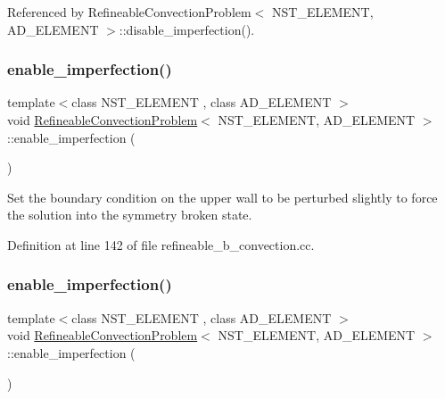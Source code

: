 Referenced by Refineable\+Convection\+Problem$<$ N\+S\+T\+\_\+\+E\+L\+E\+M\+E\+N\+T, A\+D\+\_\+\+E\+L\+E\+M\+E\+N\+T $>$\+::disable\+\_\+imperfection().

\mbox{\label{classRefineableConvectionProblem_aa97926281f88014ad45f43972184a77c}} 
\subsubsection{\texorpdfstring{enable\+\_\+imperfection()}{enable\_imperfection()}\hspace{0.1cm}{\footnotesize\ttfamily [1/2]}}
{\footnotesize\ttfamily template$<$class N\+S\+T\+\_\+\+E\+L\+E\+M\+E\+NT , class A\+D\+\_\+\+E\+L\+E\+M\+E\+NT $>$ \\
void \hyperlink{classRefineableConvectionProblem}{Refineable\+Convection\+Problem}$<$ N\+S\+T\+\_\+\+E\+L\+E\+M\+E\+NT, A\+D\+\_\+\+E\+L\+E\+M\+E\+NT $>$\+::enable\+\_\+imperfection (\begin{DoxyParamCaption}{ }\end{DoxyParamCaption})\hspace{0.3cm}{\ttfamily [inline]}}



Set the boundary condition on the upper wall to be perturbed slightly to force the solution into the symmetry broken state. 



Definition at line 142 of file refineable\+\_\+b\+\_\+convection.\+cc.

\mbox{\label{classRefineableConvectionProblem_aa97926281f88014ad45f43972184a77c}} 
\subsubsection{\texorpdfstring{enable\+\_\+imperfection()}{enable\_imperfection()}\hspace{0.1cm}{\footnotesize\ttfamily [2/2]}}
{\footnotesize\ttfamily template$<$class N\+S\+T\+\_\+\+E\+L\+E\+M\+E\+NT , class A\+D\+\_\+\+E\+L\+E\+M\+E\+NT $>$ \\
void \hyperlink{classRefineableConvectionProblem}{Refineable\+Convection\+Problem}$<$ N\+S\+T\+\_\+\+E\+L\+E\+M\+E\+NT, A\+D\+\_\+\+E\+L\+E\+M\+E\+NT $>$\+::enable\+\_\+imperfection (\begin{DoxyParamCaption}{ }\end{DoxyParamCaption})\hspace{0.3cm}{\ttfamily [inline]}}



